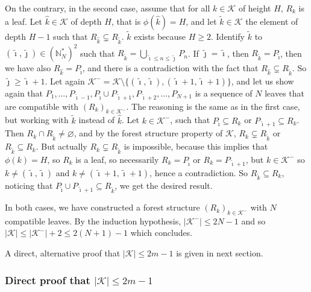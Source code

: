 \documentclass[
  11pt,
  a4paper,
]{article}
\theoremstyle{plain}
\theoremstyle{definition}
\theoremstyle{plain}
\theoremstyle{definition}
\theoremstyle{plain}
\theoremstyle{remark}
\begin{document}
On the contrary, in the second case, assume that for all
\(k\in\mathcal{K}\) of height \(H\), \(R_k\) is a leaf. Let
\(\hat k\in\mathcal{K}\) of depth \(H\), that is \(\phi(\hat k)=H\), and
let \(\tilde k\in\mathcal{K}\) the element of depth \(H-1\) such that
\(R_{\hat k}\subsetneq R_{\tilde k}\). \(\tilde k\) exists because
\(H\geq2\). Identify \(\tilde k\) to
\((\tilde\imath, \tilde\jmath)\in \left(\mathbb N_N^* \right)^2\) such
that \(R_{\tilde k}=\bigcup_{\tilde\imath\leq n\leq \tilde\jmath}P_n\).
If \(\tilde\jmath=\tilde\imath\), then
\(R_{\tilde k}=P_{\tilde\imath}\), then we have also
\(R_{\hat k}=P_{\tilde\imath}\), and there is a contradiction with the
fact that \(R_{\hat k}\subsetneq R_{\tilde k}\). So
\(\tilde\jmath\geq\tilde\imath+1\). Let again
\(\mathcal{K}^-=\mathcal{K}\setminus\{(\tilde\imath, \tilde\imath), (\tilde\imath+1, \tilde\imath+1)\}\),
and let us show again that
\(P_1,\dotsc,P_{\tilde\imath-1}, P_{\tilde\imath}\cup P_{\tilde\imath+1},P_{\tilde\imath+2},\dotsc,P_{N+1}\)
is a sequence of \(N\) leaves that are compatible with
\((R_k)_{k\in\mathcal{K}^-}\). The reasoning is the same as in the first
case, but working with \(\tilde k\) instead of \(\hat k\). Let
\(k\in\mathcal{K}^-\), such that \(P_{\tilde\imath}\subseteq R_k\) or
\(P_{\tilde\imath+1}\subseteq R_k\). Then
\(R_k\cap R_{\tilde k}\neq\varnothing\), and by the forest structure
property of \(\mathcal{K}\), \(R_k\subsetneq R_{\tilde k}\) or
\(R_{\tilde k}\subseteq R_k\). But actually
\(R_k\subsetneq R_{\tilde k}\) is impossible, because this implies that
\(\phi(k)=H\), so \(R_k\) is a leaf, so necessarily
\(R_k=P_{\tilde\imath}\) or \(R_k=P_{\tilde\imath+1}\), but
\(k\in\mathcal{K}^-\) so \(k\neq(\tilde\imath, \tilde\imath)\) and
\(k\neq(\tilde\imath+1, \tilde\imath+1)\), hence a contradiction. So
\(R_{\tilde k}\subseteq R_k\), noticing that
\(P_{\tilde\imath}\cup P_{\tilde\imath+1}\subseteq R_{\tilde k}\), we
get the desired result.

In both cases, we have constructed a forest structure
\((R_k)_{k\in\mathcal{K}^-}\) with \(N\) compatible leaves. By the
induction hypothesis, \(|\mathcal{K}^-|\leq 2N-1\) and so
\(|\mathcal{K}|\leq|\mathcal{K}^-|+2\leq 2(N+1)-1\) which concludes.

A direct, alternative proof that \(|\mathcal{K}|\leq 2m-1\) is given in
next section.

\subsubsection{\texorpdfstring{Direct proof that
\(|\mathcal{K}|\leq 2m-1\)}{Direct proof that \textbar\textbackslash mathcal\{K\}\textbar\textbackslash leq 2m-1}}\label{direct-proof-that-mathcalkleq-2m-1}
\end{document}
